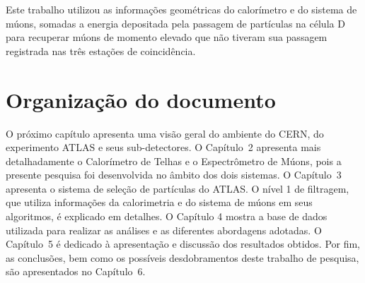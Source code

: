 Este trabalho utilizou as informações geométricas do calorímetro e do sistema de
múons, somadas a energia depositada pela passagem de partículas na célula D para
recuperar múons de momento elevado que não tiveram sua passagem registrada nas
três estações de coincidência.

\section{Organização do documento}

O próximo capítulo apresenta uma visão geral do ambiente do CERN, do experimento
ATLAS e seus sub-detectores.  O Capítulo~2 apresenta mais detalhadamente o
Calorímetro de Telhas e o Espectrômetro de Múons, pois a presente pesquisa foi
desenvolvida no âmbito dos dois sistemas.  O Capítulo~3 apresenta o sistema de
seleção de partículas do ATLAS. O nível 1 de filtragem, que utiliza informações
da calorimetria e do sistema de múons em seus algoritmos, é explicado em
detalhes. O Capítulo 4 mostra a base de dados utilizada para realizar as
análises e as diferentes abordagens adotadas. O Capítulo~5  é dedicado à
apresentação e discussão dos resultados obtidos.   Por fim, as conclusões, bem
como os possíveis desdobramentos deste trabalho de pesquisa, são apresentados no
Capítulo~6.
